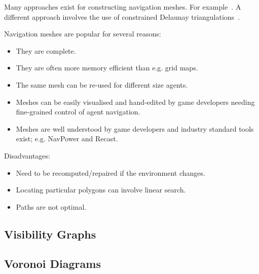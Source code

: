 Many approaches exist for constructing navigation meshes. For example~\citep{snook00}.
A different approach involves the use of constrained Delaunay triangulations~\citep{demyen07}.

Navigation meshes are popular for several reasons:
\begin{itemize}
\item{They are complete.}
\item{They are often more memory efficient than e.g. grid maps.}
\item{The same mesh can be re-used for different size agents.}
\item{Meshes can be easily visualised and hand-edited by game developers needing
fine-grained control of agent navigation.}
\item{Meshes are well understood by game developers and industry standard tools exist; e.g. NavPower and Recast.}
\end{itemize}


Disadvantages: 
\begin{itemize}
\item Need to be recomputed/repaired if the environment changes.
\item Locating particular polygons can involve linear search.
\item Paths are not optimal.
\end{itemize}



\subsection{Visibility Graphs}
\label{cha::lit::graphs::vis}

\subsection{Voronoi Diagrams}
\label{cha::lit::graphs::voronoi}

